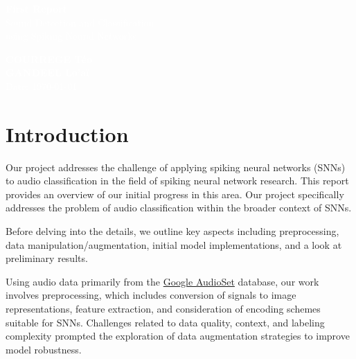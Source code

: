 \documentclass[11pt]{article}
\begin{document}
\pagecolor{darkbluegrey}
\afterpage{\nopagecolor}


\begin{titlepage}
  \begin{center}
    \textcolor{white}{\textbf{\Huge First Report}}\\ %
    \vspace{1cm}
    \textcolor{white}{\Large Sound Detection and Classification\\using Spiking Neural Networks} %
    \vspace{3cm}
  \end{center}
  \begin{center}
    \textcolor{white}{ %
      \textbf{COURREGE Téo}\\
      \textbf{GANDEEL Lo'aï}\\
      \vspace{1cm}
      \Large Date: \today}
  \end{center}
\end{titlepage}

\newpage

\tableofcontents

\pagebreak

\listoffigures

\pagebreak

\section{Introduction}

Our project addresses the challenge of applying spiking neural networks (SNNs) to audio classification in the field of spiking neural network research. This report provides an overview of our initial progress in this area. Our project specifically addresses the problem of audio classification within the broader context of SNNs.

Before delving into the details, we outline key aspects including preprocessing, data manipulation/augmentation, initial model implementations, and a look at preliminary results.

Using audio data primarily from the \href{https://research.google.com/audioset/}{Google AudioSet} database, our work involves preprocessing, which includes conversion of signals to image representations, feature extraction, and consideration of encoding schemes suitable for SNNs. Challenges related to data quality, context, and labeling complexity prompted the exploration of data augmentation strategies to improve model robustness.
\end{document}
